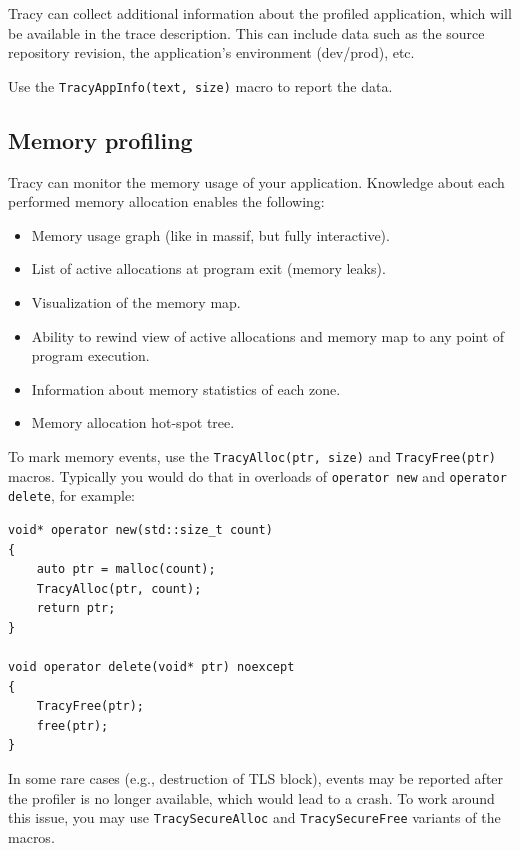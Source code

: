 \documentclass[hidelinks,titlepage,a4paper,twoside]{article}
\begin{document}
Tracy can collect additional information about the profiled application, which will be available in the trace description. This can include data such as the source repository revision, the application's environment (dev/prod), etc.

Use the \texttt{TracyAppInfo(text, size)} macro to report the data.

\subsection{Memory profiling}
\label{memoryprofiling}

Tracy can monitor the memory usage of your application. Knowledge about each performed memory allocation enables the following:

\begin{itemize}
\item Memory usage graph (like in massif, but fully interactive).
\item List of active allocations at program exit (memory leaks).
\item Visualization of the memory map.
\item Ability to rewind view of active allocations and memory map to any point of program execution.
\item Information about memory statistics of each zone.
\item Memory allocation hot-spot tree.
\end{itemize}

To mark memory events, use the \texttt{TracyAlloc(ptr, size)} and \texttt{TracyFree(ptr)} macros. Typically you would do that in overloads of \texttt{operator new} and \texttt{operator delete}, for example:

\begin{lstlisting}
void* operator new(std::size_t count)
{
    auto ptr = malloc(count);
    TracyAlloc(ptr, count);
    return ptr;
}

void operator delete(void* ptr) noexcept
{
    TracyFree(ptr);
    free(ptr);
}
\end{lstlisting}

In some rare cases (e.g., destruction of TLS block), events may be reported after the profiler is no longer available, which would lead to a crash. To work around this issue, you may use \texttt{TracySecureAlloc} and \texttt{TracySecureFree} variants of the macros.
\end{document}
